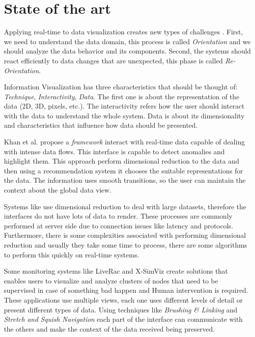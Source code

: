 \documentclass[letterpaper, 10 pt, conference]{ieeeconf}  %
\begin{document}
\section{State of the art}
\label{section:stateofart}
Applying real-time to data visualization creates new types of challenges \cite{7994551}. First, we need to understand the data domain, this process is called \textit{Orientation} and we should analyze the data behavior and its components. Second, the systems should react efficiently to data changes that are unexpected, this phase is called \textit{Re-Orientation}.

Information Visualization has three characteristics that should be thought of: \textit{Technique}, \textit{Interactivity}, \textit{Data}. The first one is about \cite{981847} the representation of the data (2D, 3D, pixels, etc.). The interactivity refers how the user should interact with the data to understand the whole system. Data is about its dimensionality and characteristics that influence how data should be presented.

Khan et al. \cite{1878880183} propose a \textit{framework} interact with real-time data capable of dealing with intense data flows. This interface is capable to detect anomalies and highlight them. This approach perform dimensional reduction to the data and then using a recommendation system it chooses the suitable representations for the data. The information uses smooth transitions, so the user can maintain the context about the global data view.

Systems like \cite{traub2017i2, 7338157} use dimensional reduction to deal with large datasets, therefore the interfaces do not have lots of data to render. These processes are commonly performed at server side due to connection issues like latency and protocols. Furthermore, there is some complexities associated with performing dimensional reduction and usually they take some time to process, there are some algorithms to perform this quickly on real-time systems.

Some monitoring systems like LiveRac \cite{McLachlan} and X-SimViz \cite{7338157} create solutions that enables users to visualize and analyze clusters of nodes that need to be supervised in case of something bad happen and Human intervention is required. These applications use multiple views, each one uses different levels of detail or present different types of data. Using techniques like \textit{Brushing \& Linking} and \textit{Stretch and Squish Navigation} each part of the interface can communicate with the others and make the context of the data received being preserved.
\end{document}
